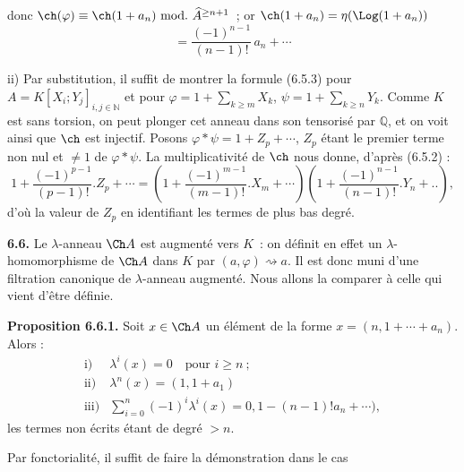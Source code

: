 donc \(\ch(\varphi)\equiv\ch(1+a_n)\ \mathrm{mod.}\ \widehat A^{\ge n+1}\)~; or \(\ch(1+a_n)=\eta(\Log(1+a_n))\)
\[
  =\frac{(-1)^{n-1}}{(n-1)!}\,a_n+\cdots
\]

ii) Par substitution, il suffit de montrer la formule (6.5.3) pour \(A=K[X_i;Y_j]_{i,j\in\mathbb N}\) et pour \(\varphi=1+\sum_{k\ge m}X_k\), \(\psi=1+\sum_{k\ge n}Y_k\). Comme \(K\) est sans torsion, on peut plonger cet anneau dans son tensorisé par \(\mathbb Q\), et on voit ainsi que \(\ch\) est injectif. Posons \(\varphi*\psi=1+Z_p+\cdots\), \(Z_p\) étant le premier terme non nul et \(\neq1\) de \(\varphi*\psi\). La multiplicativité de \(\ch\) nous donne, d'après (6.5.2) :
\[
  1+\frac{(-1)^{p-1}}{(p-1)!}.Z_p+\cdots
  =
  \left(1+\frac{(-1)^{m-1}}{(m-1)!}.X_m+\cdots\right)
  \left(1+\frac{(-1)^{n-1}}{(n-1)!}.Y_n+..\right),
\]
d'où la valeur de \(Z_p\) en identifiant les termes de plus bas degré.

\textbf{6.6.} Le \(\lambda\)-anneau \(\Ch A\) est augmenté vers \(K\)~: on définit en effet un \(\lambda\)-homomorphisme de \(\Ch A\) dans \(K\) par \((a,\varphi)\rightsquigarrow a\). Il est donc muni d'une filtration canonique de \(\lambda\)-anneau augmenté. Nous allons la comparer à celle qui vient d'être définie.

\textbf{Proposition 6.6.1.} Soit \(x\in\Ch A\) un élément de la forme \(x=(n,1+\cdots+a_n)\). Alors :
\[
\begin{array}{ll}
\text{i)}& \lambda^i(x)=0\quad\text{pour }i\ge n~;\\[0.3em]
\text{ii)}& \lambda^n(x)=(1,1+a_1)\\[0.3em]
\text{iii)}& \displaystyle\sum_{i=0}^n(-1)^i\lambda^i(x)
       =0,1-(n-1)!a_n+\cdots),
\end{array}
\]
les termes non écrits étant de degré \(>n\).

Par fonctorialité, il suffit de faire la démonstration dans le cas 
